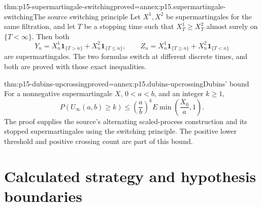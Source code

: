 \begin{hbtheorem}{thm:p15-supermartingale-switching}{proved=annex:p15.supermartingale-switching}{The source switching principle}
Let \(X^1,X^2\) be supermartingales for the same filtration, and let
\(T\) be a stopping time such that \(X^1_T\geq X^2_T\) almost surely
on \(\{T<\infty\}\). Then both
\[
 Y_n=X^1_n\mathbf1_{\{T>n\}}+X^2_n\mathbf1_{\{T\leq n\}},
 \qquad
 Z_n=X^1_n\mathbf1_{\{T\geq n\}}+X^2_n\mathbf1_{\{T<n\}}
\]
are supermartingales. The two formulas switch at different discrete times,
and both are proved with those exact inequalities.
\end{hbtheorem}

\begin{hbtheorem}{thm:p15-dubins-upcrossing}{proved=annex:p15.dubins-upcrossing}{Dubins' bound}
For a nonnegative supermartingale \(X\), \(0<a<b\), and an integer \(k\geq1\),
\[
                 P(U_\infty(a,b)\geq k)
                     \leq\left(\frac ab\right)^k
                                  E\min\left(\frac{X_0}{a},1\right).
\]
The proof supplies the source's alternating scaled-process construction
and its stopped supermartingales using the switching principle.
The positive lower threshold and positive crossing count are part of
this bound.
\end{hbtheorem}

\section{Calculated strategy and hypothesis boundaries}
\label{sec:p15-martingale-boundaries}

